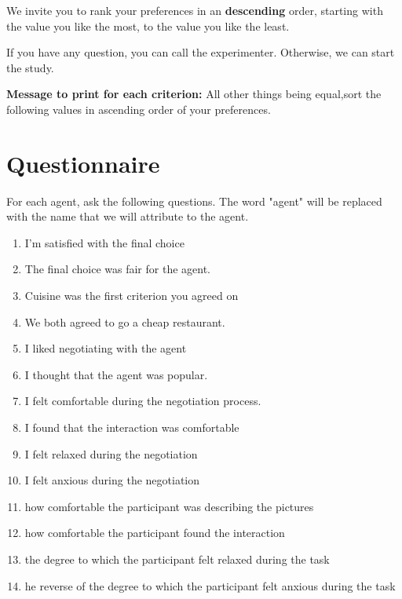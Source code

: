 \documentclass [french]{paper}
\begin{document}
		We invite you to rank your preferences in an \textbf {descending} order, starting with the value you like the most,  to the value you like the least.
		
		If you have any question, you can call the experimenter. Otherwise, we can start the study.
	
			 
			\textbf{Message to print for each criterion:}  All other things being equal,sort the following values in ascending order of your preferences.
	
		
		\section{Questionnaire}
			For each agent, ask the following questions. The word "agent" will be replaced with the name that we will attribute to the agent.
			\begin{enumerate}
			\item I'm satisfied with the final choice
			\item The final choice was fair for the agent.
			\item Cuisine was the first criterion you agreed on 
			\item  We both agreed to go a cheap restaurant.
			
			
			\item I liked negotiating with the agent
			\item I thought that the agent was popular.
			
			\item I felt comfortable during the negotiation process.
			\item I found that the interaction was comfortable
			\item I felt relaxed during the negotiation
			\item I felt anxious during the negotiation
			
			
			
			
			\item how comfortable the participant was describing the pictures
			\item how comfortable the participant found the interaction
			\item the degree to which the participant felt relaxed during the task
			\item he reverse of the degree to which the participant	felt anxious during the task
			

\end{enumerate}
\end{document}
